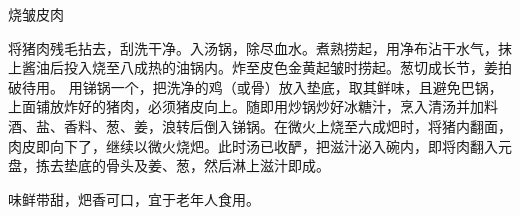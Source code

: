 \begin{recipe}{烧皱皮肉}

\ingredients


\cooking

\step 将猪肉残毛拈去，刮洗干净。入汤锅，除尽血水。煮熟捞起，用净布沾干水气，抹上酱油后投入烧至八成热的油锅内。炸至皮色金黄起皱时捞起。葱切成长节，姜拍破待用。 
\step
用锑锅一个，把洗净的鸡（或骨）放入垫底，取其鲜味，且避免巴锅，上面铺放炸好的猪肉，必须猪皮向上。随即用炒锅炒好冰糖汁，烹入清汤并加料酒、盐、香料、葱、姜，浪转后倒入锑锅。在微火上烧至六成𤆵时，将猪内翻面，肉皮即向下了，继续以微火烧𤆵。此时汤已收酽，把滋汁泌入碗内，即将肉翻入元盘，拣去垫底的骨头及姜、葱，然后淋上滋汁即成。

\notes

味鲜带甜，𤆵香可口，宜于老年人食用。 

\end{recipe}

